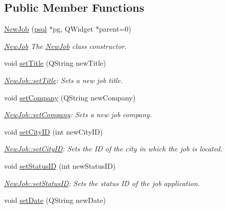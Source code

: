 \subsection*{Public Member Functions}
\begin{DoxyCompactItemize}
\item 
\hyperlink{class_new_job_a8a989ea2877d88189001ab4d9acf70cb}{New\+Job} (\hyperlink{classpsql}{psql} $\ast$pg, Q\+Widget $\ast$parent=0)
\begin{DoxyCompactList}\small\item\em \hyperlink{class_new_job}{New\+Job} The \hyperlink{class_new_job}{New\+Job} class constructor. \end{DoxyCompactList}\item 
void \hyperlink{class_new_job_ae8c2b576f2ea6f444776e6d944f0d767}{set\+Title} (Q\+String new\+Title)
\begin{DoxyCompactList}\small\item\em \hyperlink{class_new_job_ae8c2b576f2ea6f444776e6d944f0d767}{New\+Job\+::set\+Title}\+: Sets a new job title. \end{DoxyCompactList}\item 
void \hyperlink{class_new_job_ad9f522f4a6a45348ecc3ab1229b5eabb}{set\+Company} (Q\+String new\+Company)
\begin{DoxyCompactList}\small\item\em \hyperlink{class_new_job_ad9f522f4a6a45348ecc3ab1229b5eabb}{New\+Job\+::set\+Company}\+: Sets a new job company. \end{DoxyCompactList}\item 
void \hyperlink{class_new_job_a715852b239121af2b12ce36eded8faa0}{set\+City\+ID} (int new\+City\+ID)
\begin{DoxyCompactList}\small\item\em \hyperlink{class_new_job_a715852b239121af2b12ce36eded8faa0}{New\+Job\+::set\+City\+ID}\+: Sets the ID of the city in which the job is located. \end{DoxyCompactList}\item 
void \hyperlink{class_new_job_aa184d2046d0e60e82cd5840c40b99bed}{set\+Status\+ID} (int new\+Status\+ID)
\begin{DoxyCompactList}\small\item\em \hyperlink{class_new_job_aa184d2046d0e60e82cd5840c40b99bed}{New\+Job\+::set\+Status\+ID}\+: Sets the status ID of the job application. \end{DoxyCompactList}\item 
void \hyperlink{class_new_job_a0a1d9067e72f797ad3b1f01d44fedb0f}{set\+Date} (Q\+String new\+Date)

\end{DoxyCompactItemize}
